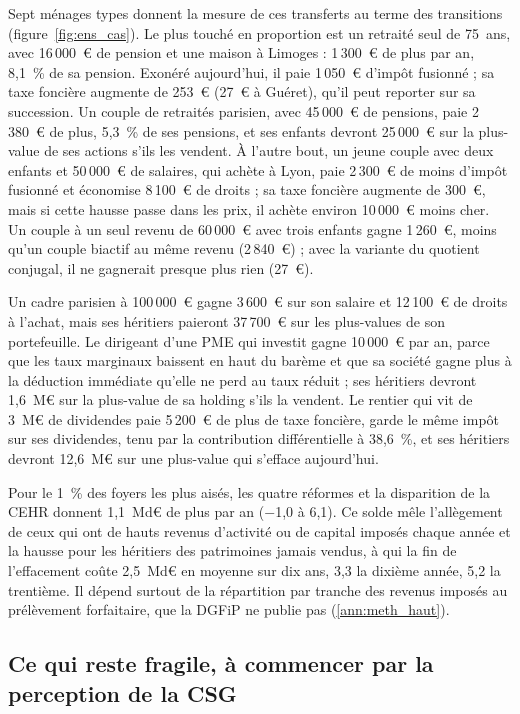 Sept ménages types donnent la mesure de ces transferts au terme des transitions (figure~\ref{fig:ens_cas}). Le plus
touché en proportion est un retraité seul de 75~ans, avec 16\,000~€ de pension et une maison à Limoges : 1\,300~€ de
plus par an, 8,1~\% de sa pension. Exonéré aujourd'hui, il paie 1\,050~€ d'impôt fusionné ; sa taxe foncière augmente de
253~€ (27~€ à Guéret), qu'il peut reporter sur sa succession. Un couple de retraités parisien, avec 45\,000~€ de
pensions, paie 2\,380~€ de plus, 5,3~\% de ses pensions, et ses enfants devront 25\,000~€ sur la plus-value de ses
actions s'ils les vendent. À l'autre bout, un jeune couple avec deux enfants et 50\,000~€ de salaires, qui achète à
Lyon, paie 2\,300~€ de moins d'impôt fusionné et économise 8\,100~€ de droits ; sa taxe foncière augmente de 300~€, mais
si cette hausse passe dans les prix, il achète environ 10\,000~€ moins cher. Un couple à un seul revenu de 60\,000~€
avec trois enfants gagne 1\,260~€, moins qu'un couple biactif au même revenu (2\,840~€) ; avec la variante du quotient
conjugal, il ne gagnerait presque plus rien (27~€).

Un cadre parisien à 100\,000~€ gagne 3\,600~€ sur son salaire et 12\,100~€ de droits à l'achat, mais ses héritiers
paieront 37\,700~€ sur les plus-values de son portefeuille. Le dirigeant d'une PME qui investit gagne 10\,000~€ par
an, parce que les taux marginaux baissent en haut du barème et que sa société gagne plus à la déduction immédiate
qu'elle ne perd au taux réduit ; ses héritiers devront 1,6~M€ sur la plus-value de sa holding s'ils la vendent. Le
rentier qui vit de 3~M€ de dividendes paie 5\,200~€ de plus de taxe foncière, garde le même impôt sur ses dividendes,
tenu par la contribution différentielle à 38,6~\%, et ses héritiers devront 12,6~M€ sur une plus-value qui s'efface
aujourd'hui.

Pour le 1~\% des foyers les plus aisés, les quatre réformes et la disparition de la CEHR donnent 1,1~Md€ de plus par
an ($-$1,0 à 6,1). Ce solde mêle l'allègement de ceux qui ont de hauts revenus d'activité ou de capital imposés chaque
année et la hausse pour les héritiers des patrimoines jamais vendus, à qui la fin de l'effacement coûte 2,5~Md€ en
moyenne sur dix ans, 3,3 la dixième année, 5,2 la trentième. Il dépend surtout de la répartition par tranche des
revenus imposés au prélèvement forfaitaire, que la DGFiP ne publie pas (\ref{ann:meth_haut}).

\subsection{Ce qui reste fragile, à commencer par la perception de la CSG}\label{sec:ens_fragile}


